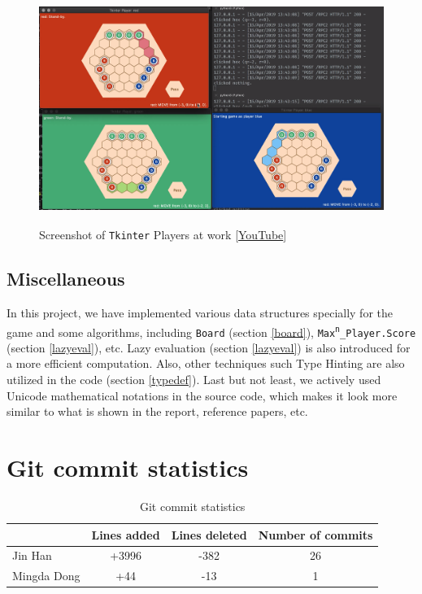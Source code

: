 \documentclass[12pt,a4paper]{article}
\begin{document}
\begin{figure}[ht]
    \centering
    \includegraphics[height=7.5cm]{tkinter_player}
    \caption{Screenshot of \texttt{Tkinter} Players at work [\href{https://www.youtube.com/watch?v=0pAZfejTCMg}{YouTube}]}
\end{figure}



\subsection{Miscellaneous}
In this project, we have implemented various data structures specially for
the game and some algorithms, including \texttt{Board} (section \ref{board}),
\texttt{Max\textsuperscript{n}\_Player.Score} (section \ref{lazyeval}), etc. 
Lazy evaluation (section \ref{lazyeval}) is also introduced for a more 
efficient computation. Also, other techniques such Type Hinting are also
utilized in the code (section \ref{typedef}). Last but not least, we actively
used Unicode mathematical notations in the source code, which makes it look 
more similar to what is shown in the report, reference papers, etc. 





\appendix
\appendixpage
\section{Git commit statistics}

\begin{table}[ht]
    \centering
    \begin{tabular}{l|c|c|c}
        & \textbf{Lines added} & \textbf{Lines deleted} & \textbf{Number of commits} \\ \hline
        Jin Han & +3996 & -382 & 26 \\ \hline
        Mingda Dong & +44 & -13 & 1
    \end{tabular}
    \caption{Git commit statistics}
\end{table}
\end{document}
